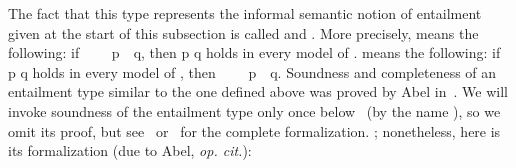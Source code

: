The fact that this type represents the informal semantic notion of entailment
given at the start of this subsection is called  and
.
More precisely,  means the following:
if ~~~~\ab p~~\ab q, then \ab p  \ab q holds in
every model of .
 means the following:
if \ab p  \ab q holds in every model of ,
then ~~~~\ab p~~\ab q.
Soundness and completeness of an entailment type similar to the one defined above was
proved by Abel in~\cite{Abel:2021}.  We will invoke soundness of the entailment type only once below%
\ifshort
~(by the name ), so we omit its proof, but see~\cite{Abel:2021}
or~\cite{DeMeo:2021c} for the complete formalization.
\else
; nonetheless, here is its formalization (due to Abel, \textit{op. cit.}):

